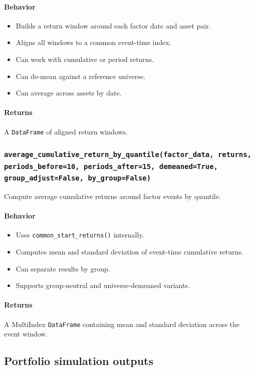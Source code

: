 \documentclass[11pt]{article}
\begin{document}
\paragraph{Behavior}
\begin{itemize}
  \item Builds a return window around each factor date and asset pair.
  \item Aligns all windows to a common event-time index.
  \item Can work with cumulative or period returns.
  \item Can de-mean against a reference universe.
  \item Can average across assets by date.
\end{itemize}

\paragraph{Returns}
A \texttt{DataFrame} of aligned return windows.

\subsubsection{\texttt{average\_cumulative\_return\_by\_quantile(factor\_data, returns, periods\_before=10, periods\_after=15, demeaned=True, group\_adjust=False, by\_group=False)}}
Compute average cumulative returns around factor events by quantile.

\paragraph{Behavior}
\begin{itemize}
  \item Uses \texttt{common\_start\_returns()} internally.
  \item Computes mean and standard deviation of event-time cumulative returns.
  \item Can separate results by group.
  \item Supports group-neutral and universe-demeaned variants.
\end{itemize}

\paragraph{Returns}
A MultiIndex \texttt{DataFrame} containing mean and standard deviation across the event window.

\subsection{Portfolio simulation outputs}
\end{document}
